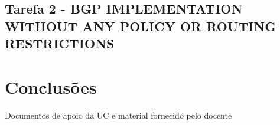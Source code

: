 \documentclass[11pt,english, openright, oneside]{book}
\begin{document}
\section{Tarefa 2 - BGP IMPLEMENTATION WITHOUT ANY POLICY OR ROUTING RESTRICTIONS}
\vspace{0.2cm}

\chapter{Conclusões}
\vspace{0.2cm}


\pagebreak

\begin{thebibliography}{4} %
   Documentos de apoio da UC e material fornecido pelo docente
\end{thebibliography}

\mainmatter
\end{document}
